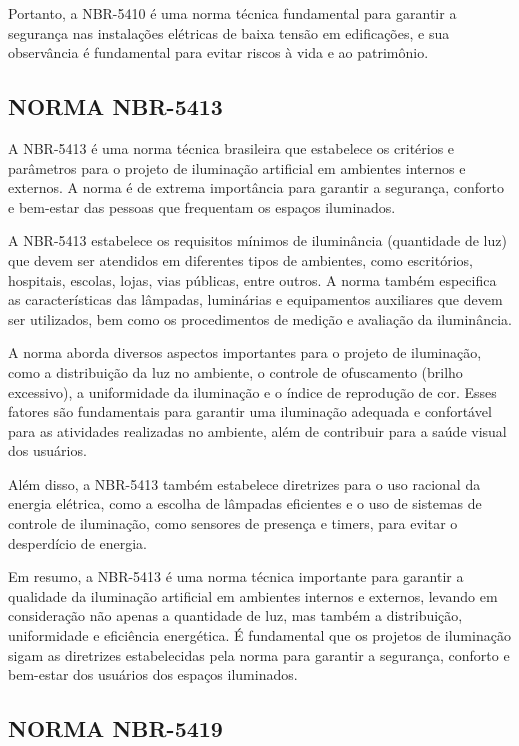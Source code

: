 Portanto, a NBR-5410 é uma norma técnica fundamental para garantir a segurança nas instalações elétricas de baixa tensão em edificações, e sua observância é fundamental para evitar riscos à vida e ao patrimônio.

\subsection{NORMA NBR-5413}

A NBR-5413 é uma norma técnica brasileira que estabelece os critérios e parâmetros para o projeto de iluminação artificial em ambientes internos e externos. A norma é de extrema importância para garantir a segurança, conforto e bem-estar das pessoas que frequentam os espaços iluminados.

A NBR-5413 estabelece os requisitos mínimos de iluminância (quantidade de luz) que devem ser atendidos em diferentes tipos de ambientes, como escritórios, hospitais, escolas, lojas, vias públicas, entre outros. A norma também especifica as características das lâmpadas, luminárias e equipamentos auxiliares que devem ser utilizados, bem como os procedimentos de medição e avaliação da iluminância.

A norma aborda diversos aspectos importantes para o projeto de iluminação, como a distribuição da luz no ambiente, o controle de ofuscamento (brilho excessivo), a uniformidade da iluminação e o índice de reprodução de cor. Esses fatores são fundamentais para garantir uma iluminação adequada e confortável para as atividades realizadas no ambiente, além de contribuir para a saúde visual dos usuários.

Além disso, a NBR-5413 também estabelece diretrizes para o uso racional da energia elétrica, como a escolha de lâmpadas eficientes e o uso de sistemas de controle de iluminação, como sensores de presença e timers, para evitar o desperdício de energia.

Em resumo, a NBR-5413 é uma norma técnica importante para garantir a qualidade da iluminação artificial em ambientes internos e externos, levando em consideração não apenas a quantidade de luz, mas também a distribuição, uniformidade e eficiência energética. É fundamental que os projetos de iluminação sigam as diretrizes estabelecidas pela norma para garantir a segurança, conforto e bem-estar dos usuários dos espaços iluminados.

\subsection{NORMA NBR-5419}


